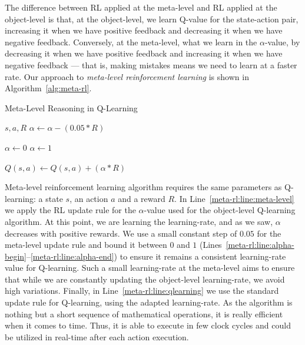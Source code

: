 The difference between RL applied at the meta-level and RL applied at the object-level is that, at the object-level, we learn Q-value for the state-action pair, increasing it when we have positive feedback and decreasing it when we have negative feedback. 
Conversely, at the meta-level, what we learn in the $\alpha$-value, by decreasing it when we have positive feedback and increasing it when we have negative feedback --- that is, making mistakes means we need to learn at a faster rate. 
Our approach to \textit{meta-level reinforcement learning} is shown in Algorithm~\ref{alg:meta-rl}. 

\begin{algorithm}
	\caption{Meta-Level Reasoning in Q-Learning}
	\label{alg:meta-rl} 
	\begin{algorithmic}[1]
		\REQUIRE $s, a, R$
		\STATE $\alpha \gets \alpha - (0.05 * R)$ \label{meta-rl:line:meta-level}
		\item[]
		 \label{meta-rl:line:alpha-begin}
			\STATE $\alpha \gets 0$
		\ENDIF
			\STATE $\alpha \gets 1$
		\ENDIF \label{meta-rl:line:alpha-end}
		\item[]
		\STATE $Q(s,a) \gets Q(s,a) + (\alpha * R)$ \label{meta-rl:line:qlearning}
	\end{algorithmic}
\end{algorithm}

Meta-level reinforcement learning algorithm requires the same parameters as Q-learning:
a state $s$, an action $a$ and a reward $R$.
In Line~\ref{meta-rl:line:meta-level} we apply the RL update rule for the $\alpha$-value used for the object-level Q-learning algorithm. 
At this point, we are learning the learning-rate, and as we saw, $\alpha$ decreases with positive rewards. 
We use a small constant step of $0.05$ for the meta-level update rule and bound it between $0$ and $1$ (Lines~\ref{meta-rl:line:alpha-begin}--\ref{meta-rl:line:alpha-end}) to ensure it remains a consistent learning-rate value for Q-learning. 
Such a small learning-rate at the meta-level aims to ensure that while we are constantly updating the object-level learning-rate, we avoid high variations. 
Finally, in Line~\ref{meta-rl:line:qlearning} we use the standard update rule for Q-learning,
using the adapted learning-rate. 
As the algorithm is nothing but a short sequence of mathematical operations, it is really efficient when it comes to time. 
Thus, it is able to execute in few clock cycles and could be utilized in real-time after each action execution.



